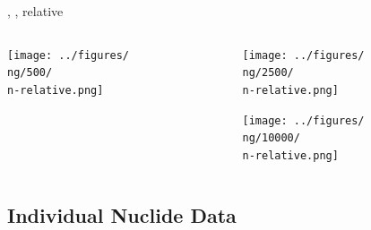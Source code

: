 \documentclass[
	11pt, %
	aspectratio=169, %
]{beamer}
\begin{document}
{{\begin{frame}{\n, \ng, relative}
\begin{columns}[c]
\begin{column}{0.39\textwidth}
				\texttt{[image: ../figures/\\ng/500/\\n-relative.png]}
			\end{column}
			\begin{column}{0.39\textwidth} %
				\texttt{[image: ../figures/\\ng/2500/\\n-relative.png]}

				\texttt{[image: ../figures/\\ng/10000/\\n-relative.png]}
			\end{column}
		\end{columns}
	\end{frame}
	}
}

\subsection{Individual Nuclide Data}
\end{document}

